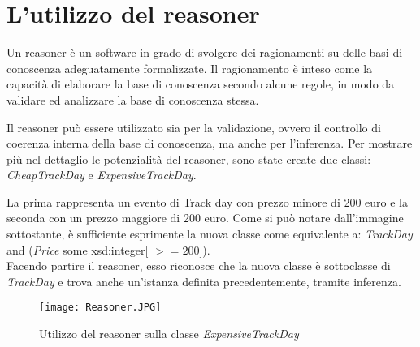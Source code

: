 \chapter{L'utilizzo del reasoner}
Un reasoner è un software in grado di svolgere dei ragionamenti su delle basi di conoscenza adeguatamente formalizzate. Il ragionamento è inteso come la capacità di elaborare la base di conoscenza secondo alcune regole, in modo da validare ed analizzare la base di conoscenza stessa. 
\\\par
Il reasoner può essere utilizzato sia per la validazione, ovvero il controllo di coerenza interna della base di conoscenza, ma anche per l’inferenza. Per mostrare più nel dettaglio le potenzialità del reasoner, sono state create due classi: \textit{CheapTrackDay} e \textit{ExpensiveTrackDay}. 
\\\par
La prima rappresenta un evento di Track day con prezzo minore di 200 euro e la seconda con un prezzo maggiore di 200 euro. Come si può notare dall’immagine sottostante, è sufficiente esprimente la nuova classe come equivalente a: \textit{TrackDay} and (\textit{Price} some xsd:integer[ $>=200$]).
\\
Facendo partire il reasoner, esso riconosce che la nuova classe è sottoclasse di \textit{TrackDay} e trova anche un’istanza definita precedentemente, tramite inferenza.
\begin{figure}[h]
	\centering
	\texttt{[image: Reasoner.JPG]}
	\caption{Utilizzo del reasoner sulla classe \textit{ExpensiveTrackDay}}
\end{figure}
\clearpage
